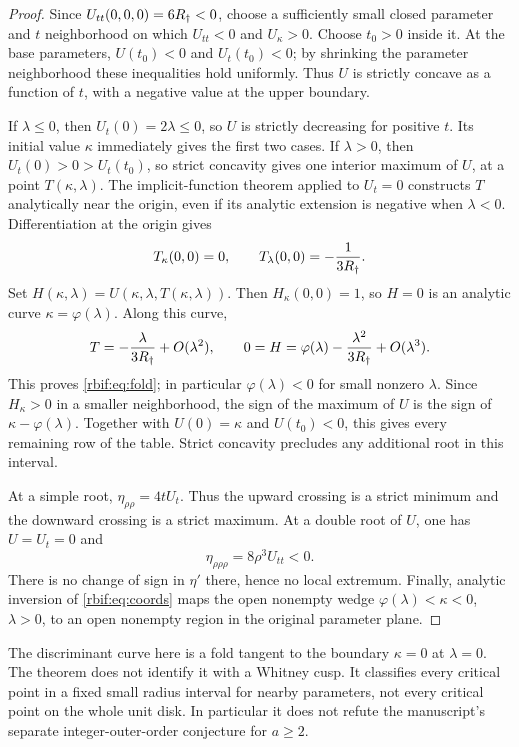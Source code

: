 \begin{proof}
Since $U_{tt}(0,0,0)=6R_\dagger<0$, choose a sufficiently small closed
parameter and $t$ neighborhood on which $U_{tt}<0$ and $U_\kappa>0$.
Choose $t_0>0$ inside it. At the base parameters,
$U(t_0)<0$ and $U_t(t_0)<0$; by shrinking the parameter neighborhood
these inequalities hold uniformly. Thus $U$ is strictly concave as a
function of $t$, with a negative value at the upper boundary.

If $\lambda\le0$, then $U_t(0)=2\lambda\le0$, so $U$ is strictly
decreasing for positive $t$. Its initial value $\kappa$ immediately
gives the first two cases.
If $\lambda>0$, then $U_t(0)>0>U_t(t_0)$, so strict concavity gives
one interior maximum of $U$, at a point $T(\kappa,\lambda)$.
The implicit-function theorem applied to $U_t=0$ constructs $T$
analytically near the origin, even if its analytic extension is negative
when $\lambda<0$. Differentiation at the origin gives
\[
 T_\kappa(0,0)=0,\qquad T_\lambda(0,0)=-\frac1{3R_\dagger}.
\]
Set $H(\kappa,\lambda)=U(\kappa,\lambda,T(\kappa,\lambda))$.
Then $H_\kappa(0,0)=1$, so $H=0$ is an analytic curve
$\kappa=\varphi(\lambda)$. Along this curve,
\[
 T=-\frac{\lambda}{3R_\dagger}+O(\lambda^2),\qquad
 0=H=\varphi(\lambda)-\frac{\lambda^2}{3R_\dagger}+O(\lambda^3).
\]
This proves \eqref{rbif:eq:fold}; in particular $\varphi(\lambda)<0$
for small nonzero $\lambda$.
Since $H_\kappa>0$ in a smaller neighborhood, the sign of the maximum
of $U$ is the sign of $\kappa-\varphi(\lambda)$. Together with
$U(0)=\kappa$ and $U(t_0)<0$, this gives every remaining row of the table.
Strict concavity precludes any additional root in this interval.

At a simple root, $\eta_{\rho\rho}=4tU_t$. Thus the upward crossing
is a strict minimum and the downward crossing is a strict maximum.
At a double root of $U$, one has $U=U_t=0$ and
\[
 \eta_{\rho\rho\rho}=8\rho^3U_{tt}<0.
\]
There is no change of sign in $\eta'$ there, hence no local extremum.
Finally, analytic inversion of \eqref{rbif:eq:coords} maps the open
nonempty wedge $\varphi(\lambda)<\kappa<0$, $\lambda>0$, to an open
nonempty region in the original parameter plane.
\end{proof}

\begin{remark}
The discriminant curve here is a fold tangent to the boundary
$\kappa=0$ at $\lambda=0$. The theorem does not identify it with a
Whitney cusp. It classifies every critical point in a fixed small radius
interval for nearby parameters, not every critical point on the whole
unit disk. In particular it does not refute the manuscript's separate
integer-outer-order conjecture for $a\ge2$.
\end{remark}

